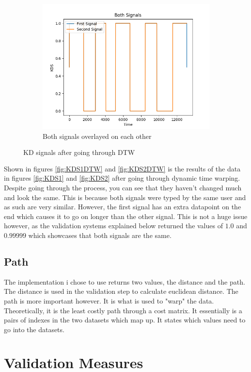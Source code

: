 \documentclass[10pt,a4paper]{report}
\begin{document}
\begin{figure}
\begin{subfigure}[b]{0.3\textwidth}
		\includegraphics[width=\textwidth]{KDSBothDTW}
		\caption{Both signals overlayed on each other}
		\label{fig:KDSBothDTW}
	\end{subfigure}
	\caption{KD signals after going through DTW}
	\label{fig:KDSDTW}
\end{figure}

Shown in figures \ref{fig:KDS1DTW} and \ref{fig:KDS2DTW} is the results of the data in figures \ref{fig:KDS1} and \ref{fig:KDS2} after going through dynamic time warping. Despite going through the process, you can see that they haven't changed much and look the same. This is because both signals were typed by the same user and as such are very similar. However, the first signal has an extra datapoint on the end which causes it to go on longer than the other signal. This is not a huge issue however, as the validation systems explained below returned the values of \(1.0\) and \(0.99999\) which showcases that both signals are the same.

\subsection{Path}
The implementation i chose to use returns two values, the distance and the path. The distance is used in the validation step to calculate euclidean distance. The path is more important however. It is what is used to "warp" the data. Theoretically, it is the least costly path through a cost matrix. It essentially is a pairs of indexes in the two datasets which map up. It states which values need to go into the datasets. 

\section{Validation Measures}
\end{document}
